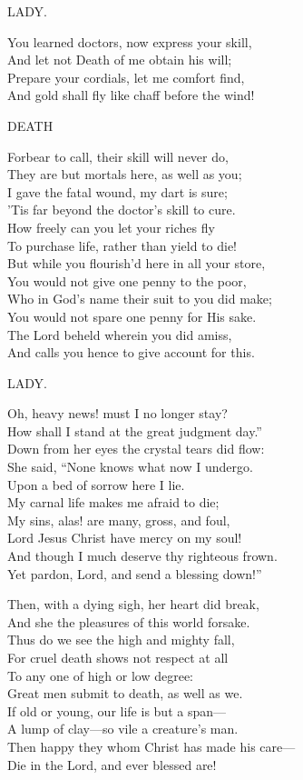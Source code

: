 \begin{dcverse}
\vin\vin\vin\vin\vin LADY.

You learned doctors, now express your skill,\\
And let not Death of me obtain his will;\\
Prepare your cordials, let me comfort find,\\
And gold shall fly like chaff before the wind!

\vin\vin\vin\vin\vin DEATH

Forbear to call, their skill will never do,\\
They are but mortals here, as well as you;\\
I gave the fatal wound, my dart is sure;\\
’Tis far beyond the doctor’s skill to cure.\\
How freely can you let your riches fly\\
To purchase life, rather than yield to die!\\
But while you flourish’d here in all your store,\\
You would not give one penny to the poor,\\
Who in God’s name their suit to you did make;\\
You would not spare one penny for His sake.\\
The Lord beheld wherein you did amiss,\\
And calls you hence to give account for this.

\vin\vin\vin\vin\vin LADY.

Oh, heavy news! must I no longer stay?\\
How shall I stand at the great judgment day.”\\
Down from her eyes the crystal tears did flow:\\
She said, “None knows what now I undergo.\\
Upon a bed of sorrow here I lie.\\
My carnal life makes me afraid to die;\\
My sins, alas! are many, gross, and foul,\\
Lord Jesus Christ have mercy on my soul!\\
And though I much deserve thy righteous frown.\\
Yet pardon, Lord, and send a blessing down!”

Then, with a dying sigh, her heart did break,\\
And she the pleasures of this world forsake.\\
Thus do we see the high and mighty fall,\\
For cruel death shows not respect at all\\
To any one of high or low degree:\\
Great men submit to death, as well as we.\\
If old or young, our life is but a span—\\
A lump of clay—so vile a creature’s man.\\
Then happy they whom Christ has made his care—\\
Die in the Lord, and ever blessed are!
\end{dcverse}
\pagebreak

